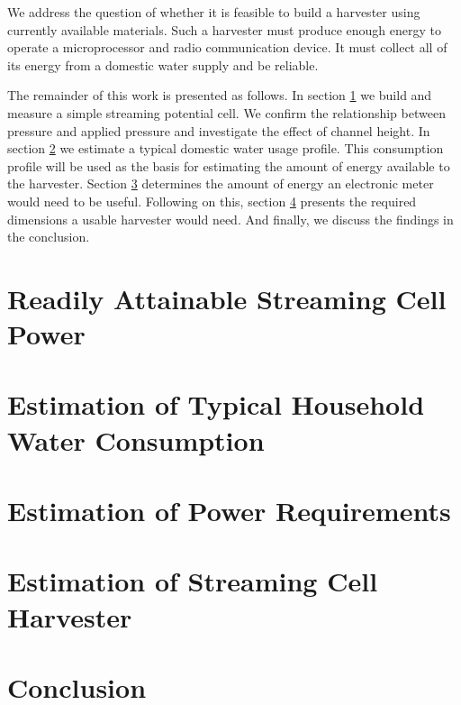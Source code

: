 \documentclass[10pt,final,journal]{IEEEtran}
\begin{document}
    We address the question of whether it is feasible to build a harvester using currently available materials.
    Such a harvester must produce enough energy to operate a microprocessor and radio communication device.
    It must collect all of its energy from a domestic water supply and be reliable.

    The remainder of this work is presented as follows.
    In section \ref{sect:streamingCell} we build and measure a simple streaming potential cell.
    We confirm the relationship between pressure and applied pressure and investigate the effect of channel height.
    In section \ref{sect:waterConsumption} we estimate a typical domestic water usage profile.
    This consumption profile will be used as the basis for estimating the amount of energy available to the harvester.
    Section \ref{sect:powerRequirements} determines the amount of energy an electronic meter would need to be useful.
    Following on this, section \ref{sect:harvesterSize} presents the required dimensions a usable harvester would need.
    And finally, we discuss the findings in the conclusion.



    \section{Readily Attainable Streaming Cell Power}
    \label{sect:streamingCell}
    \section{Estimation of Typical Household Water Consumption}
    \label{sect:waterConsumption}
    \section{Estimation of Power Requirements}
    \label{sect:powerRequirements}
    \section{Estimation of Streaming Cell Harvester}
    \label{sect:harvesterSize}
    \section{Conclusion}
    
     
\end{document}
